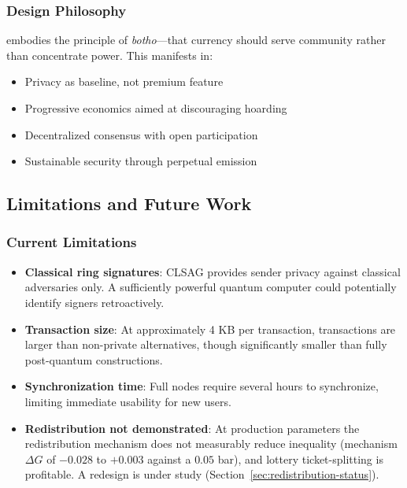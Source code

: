 \subsubsection{Design Philosophy}

\Botho embodies the principle of \textit{botho}---that currency should
serve community rather than concentrate power. This manifests in:

\begin{itemize}
  \item Privacy as baseline, not premium feature
  \item Progressive economics aimed at discouraging hoarding
  \item Decentralized consensus with open participation
  \item Sustainable security through perpetual emission
\end{itemize}

\subsection{Limitations and Future Work}

\subsubsection{Current Limitations}

\begin{itemize}
  \item \textbf{Classical ring signatures}: CLSAG provides sender privacy
    against classical adversaries only. A sufficiently powerful quantum
    computer could potentially identify signers retroactively.

  \item \textbf{Transaction size}: At approximately 4 KB per transaction,
    \Botho transactions are larger than non-private alternatives, though
    significantly smaller than fully post-quantum constructions.

  \item \textbf{Synchronization time}: Full nodes require several hours
    to synchronize, limiting immediate usability for new users.

  \item \textbf{Redistribution not demonstrated}: At production parameters
    the redistribution mechanism does not measurably reduce inequality
    (mechanism $\Delta G$ of $-0.028$ to $+0.003$ against a $0.05$ bar), and
    lottery ticket-splitting is profitable. A redesign is under study
    (Section~\ref{sec:redistribution-status}).
\end{itemize}

